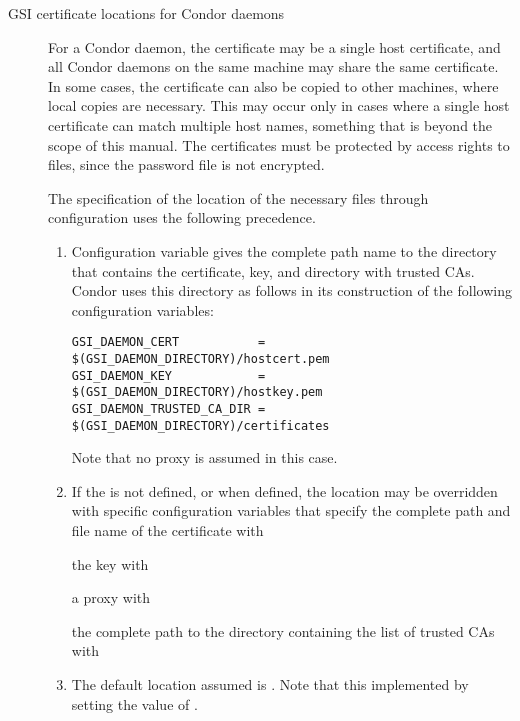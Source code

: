 \begin{description}
\item[GSI certificate locations for Condor daemons]

For a Condor daemon, the certificate may be a single host certificate,
and all Condor daemons on the same machine may share the same certificate.
In some cases, the certificate can also be copied to other machines,
where local copies are necessary.
This may occur only in cases where a single host certificate can
match multiple host names, something that is beyond the scope of this
manual. 
The certificates must be protected by access rights to files,
since the password file is not encrypted.

The specification of the location of the necessary files
through configuration uses the following precedence.
\begin{enumerate}
\item
Configuration variable  gives the complete
path name to the directory that contains the certificate, key,
and directory with trusted CAs.
Condor uses this directory as follows in its construction of the following
configuration variables:
\footnotesize
\begin{verbatim}
GSI_DAEMON_CERT           = $(GSI_DAEMON_DIRECTORY)/hostcert.pem
GSI_DAEMON_KEY            = $(GSI_DAEMON_DIRECTORY)/hostkey.pem 
GSI_DAEMON_TRUSTED_CA_DIR = $(GSI_DAEMON_DIRECTORY)/certificates 
\end{verbatim}

\normalsize
Note that no proxy is assumed in this case.
\item
If the  is not defined, 
or when defined,
the location may be overridden with specific configuration
variables that specify the complete path and file name of 
the certificate with
the key with
a proxy with
the complete path to the directory containing the list of trusted CAs with 
\item
The default location assumed is .
Note that this implemented by setting the value of  
.
\end{enumerate}


\end{description}
